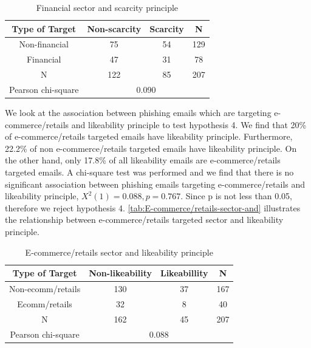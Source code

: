\begin{minipage}[t]{1\columnwidth}%
\begin{longtable}{cccc}
\caption{\label{tab:Financial-sector-and}Financial sector and scarcity principle}
\tabularnewline
\toprule 
{\footnotesize{}Type of Target} & {\footnotesize{}Non-scarcity} & {\footnotesize{}Scarcity} & \multirow{1}{*}{{\footnotesize{}N}}\tabularnewline
\midrule 
\multirow{1}{*}{{\footnotesize{}Non-financial}} & {\footnotesize{}75} & {\footnotesize{}54} & \multirow{1}{*}{{\footnotesize{}129}}\tabularnewline
\midrule 
\multirow{1}{*}{{\footnotesize{}Financial}} & {\footnotesize{}47} & {\footnotesize{}31} & \multirow{1}{*}{{\footnotesize{}78}}\tabularnewline
\midrule
\midrule 
{\footnotesize{}N} & {\footnotesize{}122} & {\footnotesize{}85} & {\footnotesize{}207}\tabularnewline
\midrule
\midrule 
{\footnotesize{}Pearson chi-square} & \multicolumn{3}{c}{{\footnotesize{}0.090}}\tabularnewline
\midrule
\end{longtable}%
\end{minipage}

We look at the association between phishing emails which are targeting
e-commerce/retails and likeability principle to test hypothesis 4.
We find that 20\% of e-commerce/retails targeted emails have likeability
principle. Furthermore, 22.2\% of non e-commerce/retails targeted
emails have likeability principle. On the other hand, only 17.8\%
of all likeability emails are e-commerce/retails targeted emails.
A chi-square test was performed and we find that there is no significant
association between phishing emails targeting e-commerce/retails and
likeability principle, $X^{2}(1)=0.088,p=0.767$. Since p is not less
than 0.05, therefore we reject hypothesis 4. \autoref{tab:E-commerce/retails-sector-and}
illustrates the relationship between e-commerce/retails targeted sector
and likeability principle.

\begin{minipage}[t]{1\columnwidth}%
\begin{longtable}{cccc}
\caption{\label{tab:E-commerce/retails-sector-and}E-commerce/retails sector
and likeability principle}
\tabularnewline
\toprule 
{\footnotesize{}Type of Target} & {\footnotesize{}Non-likeability} & {\footnotesize{}Likeabillity} & \multirow{1}{*}{{\footnotesize{}N}}\tabularnewline
\midrule 
\multirow{1}{*}{{\footnotesize{}Non-ecomm/retails}} & {\footnotesize{}130} & {\footnotesize{}37} & \multirow{1}{*}{{\footnotesize{}167}}\tabularnewline
\midrule 
\multirow{1}{*}{{\footnotesize{}Ecomm/retails}} & {\footnotesize{}32} & {\footnotesize{}8} & \multirow{1}{*}{{\footnotesize{}40}}\tabularnewline
\midrule
\midrule 
{\footnotesize{}N} & {\footnotesize{}162} & {\footnotesize{}45} & {\footnotesize{}207}\tabularnewline
\midrule
\midrule 
{\footnotesize{}Pearson chi-square} & \multicolumn{3}{c}{{\footnotesize{}0.088}}\tabularnewline
\midrule
\end{longtable}%
\end{minipage}

